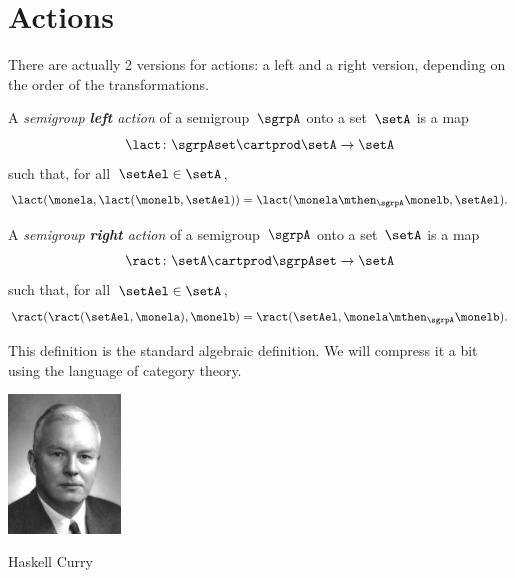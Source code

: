 

%


\section{Actions}

There are actually 2 versions for actions: a left and a right version, depending on the order of the transformations.


\begin{ctdefinition}\label{def:semigroup-left-action-prelim}
  A \emph{semigroup \textbf{left} action} of a semigroup~$\sgrpA$ onto a set~$\setA$ is a map
  \begin{equation}\label{eq:lact}
    \lact \colon \sgrpAset \cartprod \setA \to \setA
  \end{equation}
  such that, for all~$\setAel \in \setA$,
  \begin{equation}\label{eq:lact1cond}
    \lact(\monela, \lact(\monelb, \setAel)) = \lact(\monela \mthen_\sgrpA \monelb, \setAel).
  \end{equation}
\end{ctdefinition}


\begin{ctdefinition}\label{def:semigroup-right-action-prelim}
  A \emph{semigroup \textbf{right} action} of a semigroup~$\sgrpA$ onto a set~$\setA$ is a map
  \begin{equation}\label{eq:ract}
    \ract \colon \setA \cartprod \sgrpAset \to \setA
  \end{equation}
  such that, for all~$\setAel \in \setA$,
  \begin{equation}\label{eq:ract1cond}
    \ract(\ract(\setAel, \monela), \monelb) = \ract(\setAel, \monela \mthen_\sgrpA \monelb).
  \end{equation}
\end{ctdefinition}

This definition is the standard algebraic definition.
We will compress it a bit using the language of category theory.

\begin{marginfigure}
  \includegraphics[width=3cm]{../../../pics/haskell.jpg}
  \caption{Haskell Curry}
  \label{fig:haskell-curry}
\end{marginfigure}

